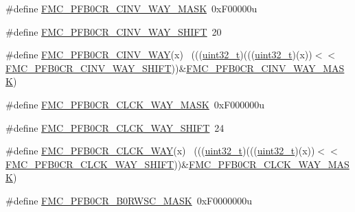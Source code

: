 \begin{DoxyCompactItemize}
\item 
\#define \hyperlink{group___f_m_c___register___masks_gad64b080bc4174e9af7d04246befca017}{F\+M\+C\+\_\+\+P\+F\+B0\+C\+R\+\_\+\+C\+I\+N\+V\+\_\+\+W\+A\+Y\+\_\+\+M\+A\+SK}~0x\+F00000u
\item 
\#define \hyperlink{group___f_m_c___register___masks_ga987dfe8d13ee805246f048943fcb9ee5}{F\+M\+C\+\_\+\+P\+F\+B0\+C\+R\+\_\+\+C\+I\+N\+V\+\_\+\+W\+A\+Y\+\_\+\+S\+H\+I\+FT}~20
\item 
\#define \hyperlink{group___f_m_c___register___masks_gad0d08df586dbedc2204ee34d32bb5f34}{F\+M\+C\+\_\+\+P\+F\+B0\+C\+R\+\_\+\+C\+I\+N\+V\+\_\+\+W\+AY}(x)                                  ~(((\hyperlink{_p_e___types_8h_a33594304e786b158f3fb30289278f5af}{uint32\+\_\+t})(((\hyperlink{_p_e___types_8h_a33594304e786b158f3fb30289278f5af}{uint32\+\_\+t})(x))$<$$<$\hyperlink{group___f_m_c___register___masks_ga987dfe8d13ee805246f048943fcb9ee5}{F\+M\+C\+\_\+\+P\+F\+B0\+C\+R\+\_\+\+C\+I\+N\+V\+\_\+\+W\+A\+Y\+\_\+\+S\+H\+I\+FT}))\&\hyperlink{group___f_m_c___register___masks_gad64b080bc4174e9af7d04246befca017}{F\+M\+C\+\_\+\+P\+F\+B0\+C\+R\+\_\+\+C\+I\+N\+V\+\_\+\+W\+A\+Y\+\_\+\+M\+A\+SK})
\item 
\#define \hyperlink{group___f_m_c___register___masks_ga84cd7c7d92e93b07f7c0f8d7cf003b98}{F\+M\+C\+\_\+\+P\+F\+B0\+C\+R\+\_\+\+C\+L\+C\+K\+\_\+\+W\+A\+Y\+\_\+\+M\+A\+SK}~0x\+F000000u
\item 
\#define \hyperlink{group___f_m_c___register___masks_ga3629d923b58bcbe6202254d72c69fab9}{F\+M\+C\+\_\+\+P\+F\+B0\+C\+R\+\_\+\+C\+L\+C\+K\+\_\+\+W\+A\+Y\+\_\+\+S\+H\+I\+FT}~24
\item 
\#define \hyperlink{group___f_m_c___register___masks_gaa5779276807bbdfb825a532c85ba55d3}{F\+M\+C\+\_\+\+P\+F\+B0\+C\+R\+\_\+\+C\+L\+C\+K\+\_\+\+W\+AY}(x)                                  ~(((\hyperlink{_p_e___types_8h_a33594304e786b158f3fb30289278f5af}{uint32\+\_\+t})(((\hyperlink{_p_e___types_8h_a33594304e786b158f3fb30289278f5af}{uint32\+\_\+t})(x))$<$$<$\hyperlink{group___f_m_c___register___masks_ga3629d923b58bcbe6202254d72c69fab9}{F\+M\+C\+\_\+\+P\+F\+B0\+C\+R\+\_\+\+C\+L\+C\+K\+\_\+\+W\+A\+Y\+\_\+\+S\+H\+I\+FT}))\&\hyperlink{group___f_m_c___register___masks_ga84cd7c7d92e93b07f7c0f8d7cf003b98}{F\+M\+C\+\_\+\+P\+F\+B0\+C\+R\+\_\+\+C\+L\+C\+K\+\_\+\+W\+A\+Y\+\_\+\+M\+A\+SK})
\item 
\#define \hyperlink{group___f_m_c___register___masks_ga6231856131c9747d8bf0b2bebcf4f172}{F\+M\+C\+\_\+\+P\+F\+B0\+C\+R\+\_\+\+B0\+R\+W\+S\+C\+\_\+\+M\+A\+SK}~0x\+F0000000u
\item 

\end{DoxyCompactItemize}
